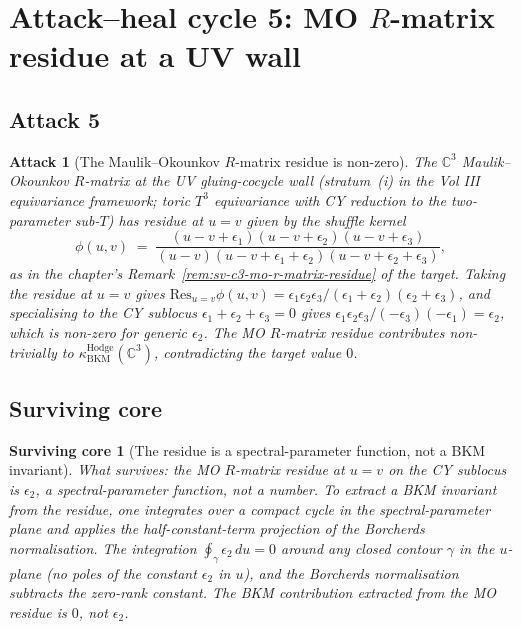 \documentclass[11pt]{article}
\newtheorem{attack}[theorem]{Attack}
\newtheorem{surviving}[theorem]{Surviving core}
\providecommand{\C}{\mathbb{C}}
\providecommand{\kBKM}{\kappa_{\mathrm{BKM}}}
\begin{document}
\section{Attack--heal cycle 5: MO $R$-matrix residue at a UV wall}
\label{sec:bl1-cycle-5}

\subsection{Attack 5}
\label{subsec:bl1-attack-5}

\begin{attack}[The Maulik--Okounkov $R$-matrix residue is non-zero]
\label{attack:bl1-mo-r-residue}
The $\C^3$ Maulik--Okounkov $R$-matrix at the UV gluing-cocycle wall
(stratum~(i) in the Vol III equivariance framework; toric $T^3$
equivariance with CY reduction to the two-parameter sub-$T$) has
residue at $u = v$ given by the shuffle kernel
\begin{equation}
  \phi(u, v) \;=\; \frac{(u - v + \epsilon_1)(u - v + \epsilon_2)
  (u - v + \epsilon_3)}{(u - v)(u - v + \epsilon_1 + \epsilon_2)
  (u - v + \epsilon_2 + \epsilon_3)},
\end{equation}
as in the chapter's Remark~\ref{rem:sv-c3-mo-r-matrix-residue} of the
target. Taking the residue at $u = v$ gives
$\mathrm{Res}_{u=v} \phi(u,v) = \epsilon_1 \epsilon_2 \epsilon_3/
(\epsilon_1 + \epsilon_2)(\epsilon_2 + \epsilon_3)$, and
specialising to the CY sublocus $\epsilon_1 + \epsilon_2 + \epsilon_3
= 0$ gives
$\epsilon_1 \epsilon_2 \epsilon_3/(-\epsilon_3)(-\epsilon_1) =
\epsilon_2$, which is \emph{non-zero} for generic $\epsilon_2$. The
MO $R$-matrix residue contributes non-trivially to
$\kBKM^{\mathrm{Hodge}}(\C^3)$, contradicting the target value $0$.
\end{attack}

\subsection{Surviving core}
\label{subsec:bl1-survive-5}

\begin{surviving}[The residue is a spectral-parameter function, not a
BKM invariant]
\label{survive:bl1-5}
What survives: the MO $R$-matrix residue at $u = v$ on the CY sublocus
is $\epsilon_2$, a \emph{spectral-parameter function}, not a number.
To extract a BKM invariant from the residue, one integrates over a
compact cycle in the spectral-parameter plane and applies the
half-constant-term projection of the Borcherds normalisation. The
integration
$\oint_{\gamma} \epsilon_2\, du = 0$ around any closed contour $\gamma$
in the $u$-plane (no poles of the constant $\epsilon_2$ in $u$),
and the Borcherds normalisation subtracts the zero-rank constant. The
BKM contribution extracted from the MO residue is $0$, not $\epsilon_2$.
\end{surviving}
\end{document}
